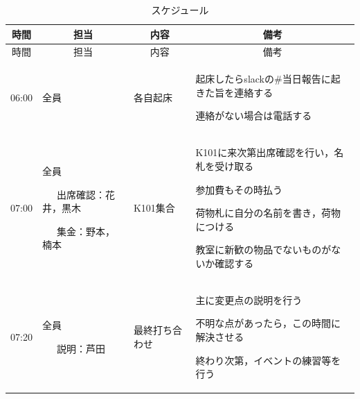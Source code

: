 \begin{longtable}[c]{|p{}|p{}|p{}|p{}|}
  \caption{スケジュール} \\
  \hline
  \multicolumn{1}{|c|}{時間} & \multicolumn{1}{c|}{担当} & \multicolumn{1}{c|}{内容} & \multicolumn{1}{c|}{備考} \\
  \hline
  \endfirsthead
  
  \hline
  \multicolumn{1}{|c|}{時間} & \multicolumn{1}{c|}{担当} & \multicolumn{1}{c|}{内容} & \multicolumn{1}{c|}{備考} \\
  \hline
  \endhead
  
  \hline
  \endfoot
  
  \hline
  \endlastfoot
  
  \begin{tpacol}
    06:00
  \end{tpacol}&
  \begin{tpbcol}
    全員
  \end{tpbcol}&
  \begin{tpccol}
    各自起床
  \end{tpccol}&
  \begin{tpdcol}
    起床したらslackの\#当日報告に起きた旨を連絡する\par
    連絡がない場合は電話する
  \end{tpdcol}\\

  \begin{tpacol}
    07:00
  \end{tpacol}&
  \begin{tpbcol}
    全員 \par
    ~~~出席確認：花井，黒木 \par
    ~~~集金：野本，楠本 \par
  \end{tpbcol}&
  \begin{tpccol}
    K101集合
  \end{tpccol}&
  \begin{tpdcol}
    K101に来次第出席確認を行い，名札を受け取る \par
    参加費もその時払う \par
    荷物札に自分の名前を書き，荷物につける \par
    教室に新歓の物品でないものがないか確認する
  \end{tpdcol}\\

  \begin{tpacol}
    07:20
  \end{tpacol}&
  \begin{tpbcol}
    全員 \par
    ~~~説明：芦田
  \end{tpbcol}&
  \begin{tpccol}
    最終打ち合わせ
  \end{tpccol}&
  \begin{tpdcol}
    主に変更点の説明を行う \par
    不明な点があったら，この時間に解決させる  \par
    終わり次第，イベントの練習等を行う
  \end{tpdcol}\\



\end{longtable}

